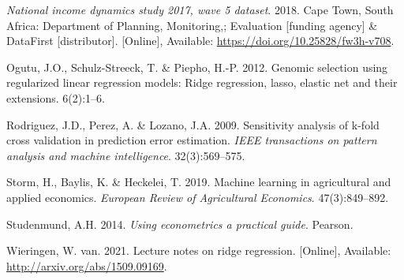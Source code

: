\documentclass[11pt,preprint, authoryear]{elsarticle}
\numberwithin{equation}{section}
\numberwithin{figure}{section}
\numberwithin{table}{section}
\newlength{\cslhangindent}
\newenvironment{CSLReferences}%
  {\setlength{\parindent}{0pt}%
  \everypar{\setlength{\hangindent}{\cslhangindent}}\ignorespaces}%
  {\par}
\begin{document}
\begin{CSLReferences}{1}{0}
\leavevmode\hypertarget{ref-nids}{}%
\emph{National income dynamics study 2017, wave 5 dataset}. 2018. Cape
Town, South Africa: Department of Planning, Monitoring,; Evaluation
{[}funding agency{]} \& DataFirst {[}distributor{]}. {[}Online{]},
Available: \url{https://doi.org/10.25828/fw3h-v708}.

\leavevmode\hypertarget{ref-lass}{}%
Ogutu, J.O., Schulz-Streeck, T. \& Piepho, H.-P. 2012. Genomic selection
using regularized linear regression models: Ridge regression, lasso,
elastic net and their extensions. 6(2):1--6.

\leavevmode\hypertarget{ref-kfold}{}%
Rodriguez, J.D., Perez, A. \& Lozano, J.A. 2009. Sensitivity analysis of
k-fold cross validation in prediction error estimation. \emph{IEEE
transactions on pattern analysis and machine intelligence}.
32(3):569--575.

\leavevmode\hypertarget{ref-ecoml}{}%
Storm, H., Baylis, K. \& Heckelei, T. 2019. {Machine learning in
agricultural and applied economics}. \emph{European Review of
Agricultural Economics}. 47(3):849--892.

\leavevmode\hypertarget{ref-econ}{}%
Studenmund, A.H. 2014. \emph{Using econometrics a practical guide}.
Pearson.

\leavevmode\hypertarget{ref-ridg}{}%
Wieringen, W. van. 2021. Lecture notes on ridge regression.
{[}Online{]}, Available: \url{http://arxiv.org/abs/1509.09169}.

\end{CSLReferences}


\end{document}
